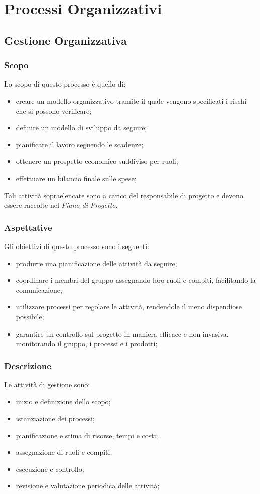 \section{Processi Organizzativi}
	\subsection{Gestione Organizzativa}
		
		
		\subsubsection{Scopo}
		Lo scopo di questo processo è quello di:
		\begin{itemize}
			\item creare un modello organizzativo tramite il quale vengono specificati i rischi che si possono verificare;
			\item definire un modello di sviluppo da seguire;
			\item pianificare il lavoro seguendo le scadenze;
			\item ottenere un prospetto economico suddiviso per ruoli;
			\item effettuare un bilancio finale sulle spese;
		\end{itemize}
		Tali attività sopraelencate sono a carico del responsabile di progetto e devono essere raccolte nel \textit{Piano di Progetto}.
		
		\subsubsection{Aspettative}
		Gli obiettivi di questo processo sono i seguenti:
		\begin{itemize}
			\item produrre una pianificazione delle attività da seguire;
			\item coordinare i membri del gruppo assegnando loro ruoli e compiti, facilitando la comunicazione;
			\item utilizzare processi per regolare le attività, rendendole il meno dispendiose possibile;
			\item garantire un controllo sul progetto in maniera efficace e non invasiva, monitorando il gruppo, i processi e i prodotti;
		\end{itemize}
	
		\subsubsection{Descrizione}
		Le attività di gestione sono:
		\begin{itemize}
			\item inizio e definizione dello scopo;
			\item istanziazione dei processi;
			\item pianificazione e stima di risorse, tempi e costi;
			\item assegnazione di ruoli e compiti;
			\item esecuzione e controllo;
			\item revisione e valutazione periodica delle attività;
		\end{itemize}
		
